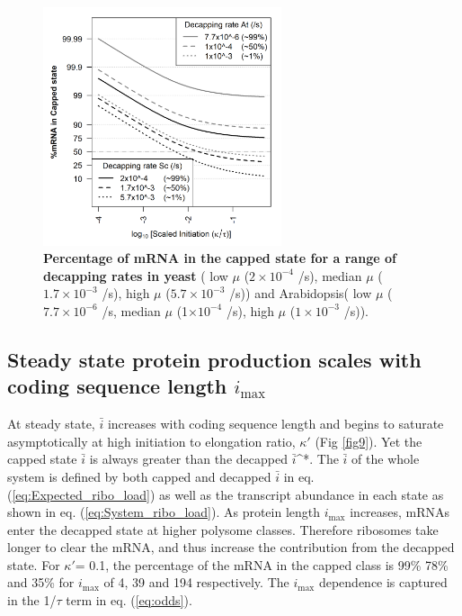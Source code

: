 \documentclass[10pt,letterpaper]{article}
\newcommand{\imax}{\ensuremath{{i_{\max}}}\xspace}
\newcommand{\MRL}{\ensuremath{\bar{i}}\xspace}
\begin{document}
\begin{figure}[!h]
\begin{center}
\includegraphics[width=70mm]{Images/2023-07-28_logodds.png}
\caption{{\bf Percentage of mRNA in the capped state for a range of decapping rates in yeast} ( low $\mu$ ($2\times 10^{-4}$ /s), median $\mu$ ($1.7\times 10^{-3}$ /s), high $\mu$ ($5.7\times 10^{-3}$ /s)) and Arabidopsis( low $\mu$ ($7.7\times 10^{-6}$ /s, median $\mu$ (1$\times 10^{-4}$ /s), high $\mu$ ($1\times 10^{-3}$ /s)). }
\label{fig8}
\end{center}
\end{figure}

\subsection*{Steady state protein production scales with coding sequence length \imax}
At steady state, \MRL increases with coding sequence length and begins to saturate asymptotically at high initiation to elongation ratio, $\kappa'$ (Fig \ref{fig9}). Yet the capped state \MRL is always greater than the decapped \MRL^*. The \MRL of the whole system is defined by both capped and decapped \MRL in eq. (\ref{eq:Expected_ribo_load}) as well as the transcript abundance in each state as shown in eq. (\ref{eq:System_ribo_load}).
As protein length \imax increases, mRNAs enter the decapped state at higher polysome classes. 
Therefore ribosomes take longer  to clear the mRNA, and thus increase the contribution from the decapped state. 
For $\kappa'$= 0.1, the percentage of the mRNA in the capped class is  99\% 78\%  and 35\% for \imax of 4, 39 and 194 respectively.
The \imax dependence is captured in the 1/$\tau$ term in eq. (\ref{eq:odds}).
  
\end{document}
